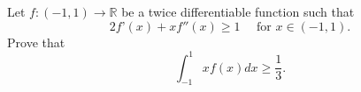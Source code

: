 Let $f:(-1,1)\to \mathbb{R}$ be a twice differentiable function such that
$$2f’(x)+xf''(x)\geqslant 1 \quad \text{ for } x\in (-1,1).$$Prove that
$$\int_{-1}^{1}xf(x)dx\geqslant \frac{1}{3}.$$
